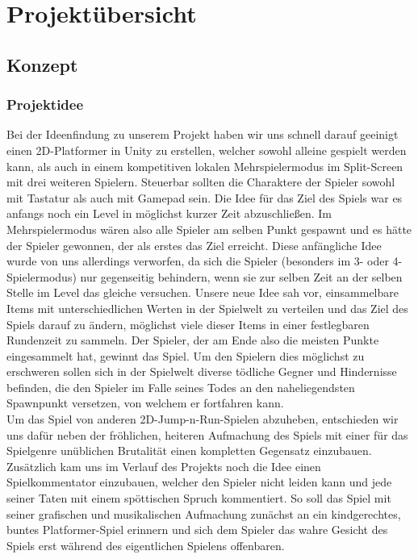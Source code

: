 \setlength{\parindent}{0em}

\chapter{Projektübersicht}

\label{Chapter1}


\section{Konzept}

\subsection{Projektidee}

Bei der Ideenfindung zu unserem Projekt haben wir uns schnell darauf geeinigt einen 2D-Platformer in Unity zu erstellen, welcher sowohl alleine gespielt werden kann, als auch in einem kompetitiven lokalen Mehrspielermodus im Split-Screen mit drei weiteren Spielern. Steuerbar sollten die Charaktere der Spieler sowohl mit Tastatur als auch mit Gamepad sein. Die Idee für das Ziel des Spiels war es anfangs noch ein Level in möglichst kurzer Zeit abzuschließen. Im Mehrspielermodus wären also alle Spieler am selben Punkt gespawnt und es hätte der Spieler gewonnen, der als erstes das Ziel erreicht. Diese anfängliche Idee wurde von uns allerdings verworfen, da sich die Spieler (besonders im 3- oder 4-Spielermodus) nur gegenseitig behindern, wenn sie zur selben Zeit an der selben Stelle im Level das gleiche versuchen. Unsere neue Idee sah vor, einsammelbare Items mit unterschiedlichen Werten in der Spielwelt zu verteilen und das Ziel des Spiels darauf zu ändern, möglichst viele dieser Items in einer festlegbaren Rundenzeit zu sammeln. Der Spieler, der am Ende also die meisten Punkte eingesammelt hat, gewinnt das Spiel. Um den Spielern dies möglichst zu erschweren sollen sich in der Spielwelt diverse tödliche Gegner und Hindernisse befinden, die den Spieler im Falle seines Todes an den naheliegendsten Spawnpunkt versetzen, von welchem er fortfahren kann.\\

Um das Spiel von anderen 2D-Jump-n-Run-Spielen abzuheben, entschieden wir uns dafür neben der fröhlichen, heiteren Aufmachung des Spiels mit einer für das Spielgenre unüblichen Brutalität einen kompletten Gegensatz einzubauen. Zusätzlich kam uns im Verlauf des Projekts noch die Idee einen Spielkommentator einzubauen, welcher den Spieler nicht leiden kann und jede seiner Taten mit einem spöttischen Spruch kommentiert. So soll das Spiel mit seiner grafischen und musikalischen Aufmachung zunächst an ein kindgerechtes, buntes Platformer-Spiel erinnern und sich dem Spieler das wahre Gesicht des Spiels erst während des eigentlichen Spielens offenbaren.

